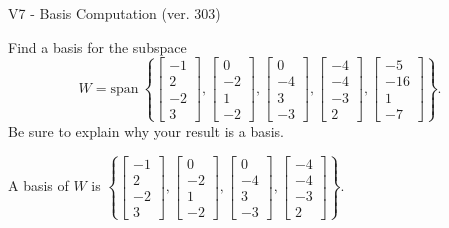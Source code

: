 \begin{exercise}
  \begin{exerciseTitle}V7 - Basis Computation (ver. 303)\end{exerciseTitle}
  \begin{exerciseStatement}
    Find a basis for the subspace 
\[W=\mathrm{span}\ \left\{\left[\begin{array}{r}
-1 \\
2 \\
-2 \\
3
\end{array}\right] , \left[\begin{array}{r}
0 \\
-2 \\
1 \\
-2
\end{array}\right] , \left[\begin{array}{r}
0 \\
-4 \\
3 \\
-3
\end{array}\right] , \left[\begin{array}{r}
-4 \\
-4 \\
-3 \\
2
\end{array}\right] , \left[\begin{array}{r}
-5 \\
-16 \\
1 \\
-7
\end{array}\right]\right\}.\]
 Be sure to explain why your result is a basis.


  \end{exerciseStatement}
  \begin{exerciseAnswer}
   A basis of \(W\) is  \(\left\{\left[\begin{array}{r}
-1 \\
2 \\
-2 \\
3
\end{array}\right] , \left[\begin{array}{r}
0 \\
-2 \\
1 \\
-2
\end{array}\right] , \left[\begin{array}{r}
0 \\
-4 \\
3 \\
-3
\end{array}\right] , \left[\begin{array}{r}
-4 \\
-4 \\
-3 \\
2
\end{array}\right]\right\}\).
  


  \end{exerciseAnswer}
\end{exercise}